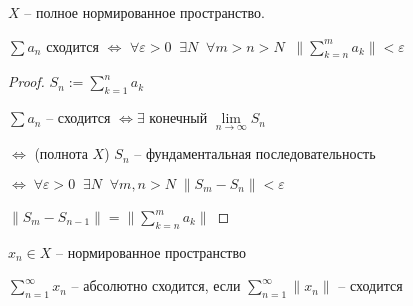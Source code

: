 
\begin{theorem} \thmslashn 
	
	$X$ -- полное нормированное пространство.
	
	$\sum a_n$ сходится $\iff $ $\forall \varepsilon > 0\;\; \exists N \;\; \forall m>n>N \;\; \|\sum\limits_{k=n}^{m}a_k\| < \varepsilon$

	\begin{proof} \thmslashn
		
		$S_n:= \sum\limits_{k=1}^{n} a_k$
		
		$\sum a_n$ -- сходится $\iff \exists $ конечный $\lim\limits_{n \to \infty} S_n$
		
		$\iff$ (полнота $X$) $S_n$ -- фундаментальная последовательность
		
		$\iff \; \forall \varepsilon > 0 \;\; \exists N \;\; \forall m,n > N\; \|S_m - S_n\| < \varepsilon$
	
	$\|S_m - S_{n - 1}\| = \|\sum\limits_{k =n}^{m}a_k\|$
	\end{proof}

\end{theorem}

\begin{definition} \thmslashn 
	
	$x_n \in X$ -- нормированное пространство

	$\sum\limits_{n = 1}^{\infty}x_n$ -- абсолютно сходится, если $\sum\limits_{n = 1}^{\infty}\|x_n\|$ -- сходится

\end{definition}

